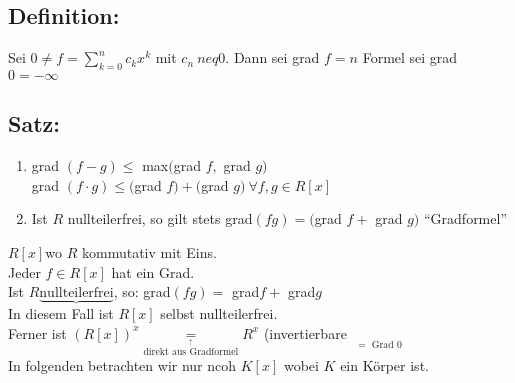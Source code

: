 \subsection{Definition:}
Sei $0 \neq f = \sum\limits^{n}_{k=0} c_{k} x^{k}$ mit $c_{n}\ neq 0$. Dann sei grad $f = n$ Formel sei grad $0 = -\infty$
%
%
%
\subsection{Satz:}
\begin{enumerate}[label={(\alph*)}]
	\item grad $(f-g) \leq $ max$($grad $f, $ grad $g)$\\
		grad $(f \cdot g) \leq ($grad $f) + ($grad $g) \ \forall f,g \in R[x]$
	\item Ist $R$ nullteilerfrei, so gilt stets grad$(fg) = ($grad $f + $ grad $g)$ "`Gradformel"'
\end{enumerate}
$R[x]$wo $R$ kommutativ mit Eins.\\
Jeder $f \in R[x]$ hat ein Grad. \\
Ist $R \underbrace{\text{nullteilerfrei}}$, so: \qquad grad$(fg)=$ grad$f +$ grad$g$\\
In diesem Fall ist $R[x]$ selbst nullteilerfrei.\\
Ferner ist $(R[x])^{x} \mathop{ = }\limits_{\mathop{\text{direkt aus Gradformel}}\limits^{\uparrow}} R^{x}$ (invertierbare $\mathop{\underbrace{\text{"`konstante"'}}}\limits_{=\text{ Grad }0}$\\
In folgenden betrachten wir nur ncoh $K[x]$ wobei $K$ ein Körper ist. 
%
%
%
